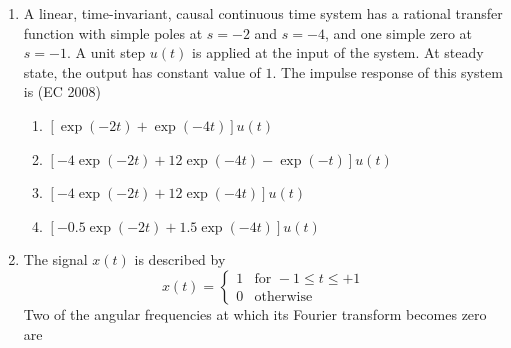 \begin{enumerate}[label=\thesubsection.\arabic*,ref=\thesubsection.\theenumi]
\hfill (EC 2008)
\begin{multicols}{2}
\begin{enumerate}
  \item $\displaystyle\sum_{n=0}^\infty (-1)^n t u(t-nT)$
  \item $\displaystyle u(t) + 2 \sum_{n=1}^\infty (-1)^n u(t-nT)$
  \item $\displaystyle t u(t) + 2 \sum_{n=1}^\infty (-1)^n (t-nT)u(t-nT)$
  \item $\displaystyle \sum_{n=0}^\infty \left[ 0.5 - e^{-(t-2nT)} + 0.5e^{-(t-2nT-T)} \right]$
\end{enumerate}
\end{multicols}
\item A linear, time-invariant, causal continuous time system has a rational transfer function with simple poles at $s=-2$ and $s= -4$, and one simple zero at $s=-1$. A unit step $u(t)$ is applied at the input of the system. At steady state, the output has constant value of $1$. The impulse response of this system is
\hfill (EC 2008)
\begin{enumerate}
    \item $\left[\exp(-2t)+\exp(-4t) \right]u(t)$
    \item $\left[ -4\exp(-2t) + 12\exp(-4t) -\exp(-t) \right]u(t)$
    \item $\left[ -4\exp(-2t) + 12\exp(-4t) \right]u(t)$
    \item $\left[ -0.5\exp(-2t) + 1.5\exp(-4t) \right]u(t)$
\end{enumerate}

\item The signal $x(t)$ is described by
\[
x(t) = \begin{cases}
1 & \text{for } -1 \leq t \leq +1 \\
0 & \text{otherwise}
\end{cases}
\]
Two of the angular frequencies at which its Fourier transform becomes zero are
 

\end{enumerate}
